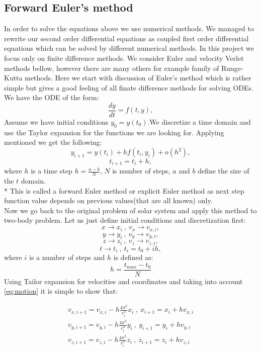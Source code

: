 \documentclass[10pt]{article}
\begin{document}
\subsection{Forward Euler's method}
In order to solve the equations above we use numerical methods. We managed to rewrite our second order differential equations as coupled first order differential equations which can be solved by different numerical methods. In this project we focus only on finite difference methods. We consider Euler and velocity Verlet methods bellow, however there are many others for example family of Runge-Kutta methods.
Here we start with discussion of Euler's method which is rather simple but gives a good feeling of all finate difference methods for solving ODEs.
We have the ODE of the form: 
\[
\frac{dy}{dt}=f(t,y),
\] 
Assume we have initial conditions $y_0 = y(t_0)$.We discretize a time domain and use the Taylor expansion for the functions we are looking for. 
Applying mentioned we get the following:
\[ 
y_{i+1}=y(t_i)+hf(t_i,y_i)+o(h^2),
\]
\[
t_{i+1}=t_i+h,
\]
where $h$ is a time step $h=\frac{a-b}{N}$, $N$ is number of steps, $a$ and $b$ define the size of the $t$ domain.\\*
This is called a forward Euler method or explicit Euler method as next step function value depends on previous values(that are all known) only.\\
Now we go back to the original problem of solar system and apply this method to two-body problem. Let us just define initial conditions and discretization first:
\[
x \rightarrow x_i \ ,\ v_x \rightarrow v_{x,i},
\]
\[
y \rightarrow y_i \ ,\ v_y \rightarrow v_{y,i},
\]
\[
z \rightarrow z_i \ ,\ v_z \rightarrow v_{z,i},
\]
\[
t \rightarrow t_i \ ,\ t_i = t_0 + ih,
\]
where $i$ is a number of steps and $h$ is defined as:
\[
h = \frac{t_{max}-t_0}{N}
\]
Using Tailor expansion for velocities and coordinates and taking into account \ref{eq:motion} it is simple to show that: 

\begin{equation}\label{eq:euler-two-body}
\begin{aligned} 
v_{x,i+1}=v_{x,i}-h\frac{4\pi^2}{r_i^3}x_i \ ,\ x_{i+1}=x_{i}+hv_{x,i}\\
v_{y,i+1}=v_{y,i}-h\frac{4\pi^2}{r_i^3}y_i \ ,\ y_{i+1}=y_{i}+hv_{y,i}\\
v_{z,i+1}=v_{z,i}-h\frac{4\pi^2}{r_i^3}z_i \ ,\ z_{i+1}=z_{i}+hv_{z,i}\\
\end{aligned}
\end{equation}
\end{document}

